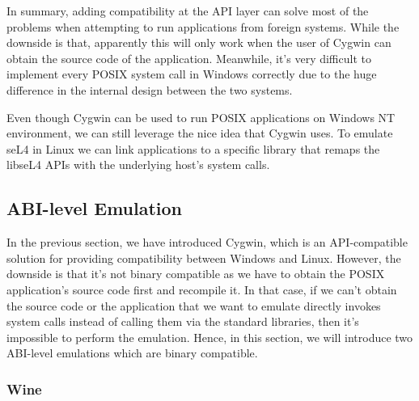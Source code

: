 In summary, adding compatibility at the API layer can solve most of the problems when attempting to run applications from foreign systems. While the downside is that, apparently this will only work when the user of Cygwin can obtain the source code of the application. Meanwhile, it's very difficult to implement every POSIX system call in Windows correctly due to the huge difference in the internal design between the two systems. 

Even though Cygwin can be used to run POSIX applications on Windows NT environment, we can still leverage the nice idea that Cygwin uses. To emulate seL4 in Linux we can link applications to a specific library that remaps the libseL4 APIs with the underlying host's system calls.

\subsection{ABI-level Emulation}

In the previous section, we have introduced Cygwin, which is an API-compatible solution for providing compatibility between Windows and Linux. However, the downside is that it's not binary compatible as we have to obtain the POSIX application's source code first and recompile it. In that case,  if we can't obtain the source code or the application that we want to emulate directly invokes system calls instead of calling them via the standard libraries, then it's impossible to perform the emulation. Hence, in this section, we will introduce two ABI-level emulations which are binary compatible.

\subsubsection{Wine}



